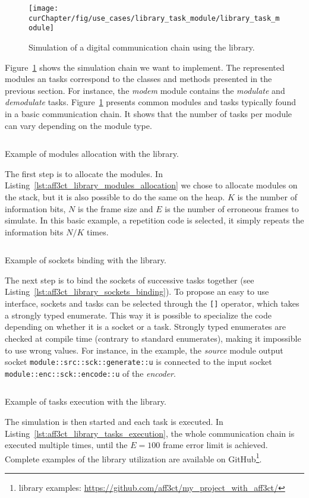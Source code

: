\begin{figure}[htp]
  \centering
  \texttt{[image: \\curChapter/fig/use\_cases/library\_task\_module/library\_task\_module]}
  \caption{Simulation of a digital communication chain using the \AFFECT
    library.}
  \label{fig:aff3ct_library_task_module}
\end{figure}
Figure~\ref{fig:aff3ct_library_task_module} shows the simulation chain we want
to implement. The represented modules an tasks correspond to the classes and
methods presented in the previous section. For instance, the \textit{modem}
module contains the \textit{modulate} and \textit{demodulate} tasks.
Figure~\ref{fig:aff3ct_library_task_module} presents common modules and tasks
typically found in a basic communication chain. It shows that the number of
tasks per module can vary depending on the module type.
\begin{listing}[htp]
  \inputminted[frame=lines,linenos]{C++}{\curChapter/src/use_cases/library/modules_allocation.cpp}
  \caption{Example of modules allocation with the \AFFECT library.}
  \label{lst:aff3ct_library_modules_allocation}
\end{listing}
The first step is to allocate the modules. In
Listing~\ref{lst:aff3ct_library_modules_allocation} we chose to allocate modules
on the stack, but it is also possible to do the same on the heap. $K$ is the
number of information bits, $N$ is the frame size and $E$ is the number of
erroneous frames to simulate. In this basic example, a repetition code is
selected, it simply repeats the information bits $N/K$ times.
\begin{listing}[htp]
  \inputminted[frame=lines,linenos]{C++}{\curChapter/src/use_cases/library/sockets_binding.cpp}
  \caption{Example of sockets binding with the \AFFECT library.}
  \label{lst:aff3ct_library_sockets_binding}
\end{listing}
The next step is to bind the sockets of successive tasks together (see
Listing~\ref{lst:aff3ct_library_sockets_binding}). To propose an easy to use
interface, sockets and tasks can be selected through the \verb|[]| operator,
which takes a \Cxx strongly typed enumerate. This way it is possible to
specialize the code depending on whether it is a socket or a task. Strongly
typed enumerates are checked at compile time (contrary to standard enumerates),
making it impossible to use wrong values. For instance, in the example, the
\textit{source} module output socket \verb|module::src::sck::generate::u| is
connected to the input socket \verb|module::enc::sck::encode::u| of the
\textit{encoder}.
\begin{listing}[htp]
  \inputminted[frame=lines,linenos]{C++}{\curChapter/src/use_cases/library/tasks_execution.cpp}
  \caption{Example of tasks execution with the \AFFECT library.}
  \label{lst:aff3ct_library_tasks_execution}
\end{listing}
The simulation is then started and each task is executed. In
Listing~\ref{lst:aff3ct_library_tasks_execution}, the whole communication chain
is executed multiple times, until the $E = 100$ frame error limit is achieved.
Complete examples of the \AFFECT library utilization are available on
GitHub\footnote{\AFFECT library examples: \url{https://github.com/aff3ct/my_project_with_aff3ct/}}.

